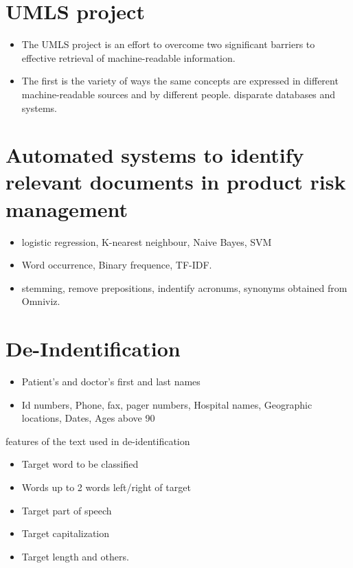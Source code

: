 \documentclass[pdftext,twoside,11pt]{article}
\begin{document}
\section{UMLS project}
\label{sec:intro} 
\begin{itemize}
\item The UMLS project is an effort to overcome two significant
 barriers to effective retrieval of machine-readable information. 
\item  The first is the variety of ways the same concepts are expressed
        in different machine-readable sources and by different people. disparate databases and systems.
\end{itemize}

\section{Automated systems to identify relevant
documents in product risk management}
\label{sec:intro} 
\begin{itemize}
\item  logistic regression, K-nearest neighbour, Naive Bayes, SVM
\item  Word occurrence, Binary frequence, TF-IDF. 
\item  stemming, remove prepositions, indentify acronums, synonyms obtained from Omniviz.
\end{itemize}
\section{De-Indentification}
\label{sec:intro} 
\begin{itemize}
\item  Patient's and doctor's first and last names 
\item  Id numbers, Phone, fax, pager numbers, Hospital names, Geographic locations, Dates, Ages above 90 
\end{itemize}
features of the text used in de-identification
\begin{itemize}
\item Target word to be classified
\item Words up to 2 words left/right of target
\item Target part of speech
\item Target capitalization
\item Target length and others.  
\end{itemize}
\end{document}
